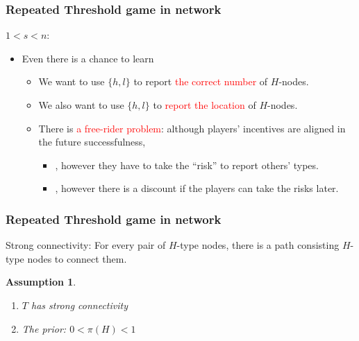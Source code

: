 \documentclass{beamer}
\newtheorem{assumption}{Assumption}[section]
\begin{document}
\begin{frame}
  \frametitle{Repeated Threshold game in network}

$1<s<n$:
  \begin{itemize}
  \item Even there is a chance to learn
\begin{center} 
  
\end{center}   
  \begin{itemize}
  \item We want to use $\{h,l\}$ to report \textcolor{red}{the correct number} of $H$-nodes.
  \item We also want to use $\{h,l\}$ to \textcolor{red}{report the location} of $H$-nodes.
  \item There is \textcolor{red}{a free-rider problem}: although players' incentives are aligned in the future successfulness,
\begin{itemize}
\item , however they have to take the ``risk'' to report others' types.
\item , however there is a discount if the players can take the risks later.
\end{itemize}  
  
  
  \end{itemize}
  \end{itemize} 
  

\end{frame}






\begin{frame}
  \frametitle{Repeated Threshold game in network}

\begin{definition}
Strong connectivity: For every pair of $H$-type nodes, there is a path consisting $H$-type nodes to connect them.
\end{definition} 

\begin{assumption}
\begin{enumerate}
\item $T$ has strong connectivity
\item The prior: $0<\pi(H)<1$ 
\end{enumerate}

\end{assumption}

\end{frame}
\end{document}
